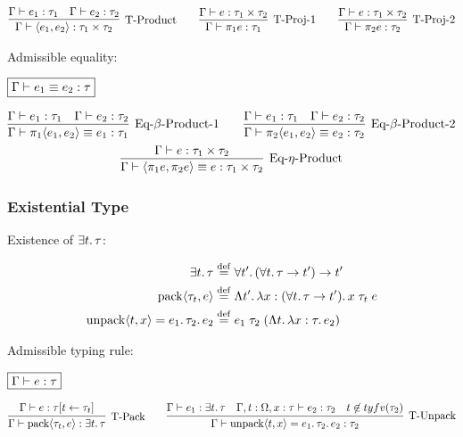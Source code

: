 \begin{gather*}
  \infer[\text{T-Product}]{\Gamma \vdash \langle e_1, e_2\rangle: \tau_1 \times \tau_2}{
    \Gamma \vdash e_1: \tau_1
    &
    \Gamma \vdash e_2: \tau_2
  }
  \hspace{2em}
  \infer[\text{T-Proj-1}]{\Gamma \vdash \pi_1 e: \tau_1}{
    \Gamma \vdash e: \tau_1 \times \tau_2
  }
  \hspace{2em}
  \infer[\text{T-Proj-2}]{\Gamma \vdash \pi_2 e: \tau_2}{
    \Gamma \vdash e: \tau_1 \times \tau_2
  }
\end{gather*}

Admissible equality:

$\fbox{$\Gamma \vdash e_1 \equiv e_2: \tau$}$

\begin{gather*}
  \infer[\text{Eq-$\beta$-Product-1}]{\Gamma \vdash \pi_1 \langle e_1, e_2\rangle \equiv e_1: \tau_1}{
    \Gamma \vdash e_1: \tau_1
    &
    \Gamma \vdash e_2: \tau_2
  }
  \hspace{2em}
  \infer[\text{Eq-$\beta$-Product-2}]{\Gamma \vdash \pi_2 \langle e_1, e_2\rangle \equiv e_2: \tau_2}{
    \Gamma \vdash e_1: \tau_1
    &
    \Gamma \vdash e_2: \tau_2
  }
  \\
  \infer[\text{Eq-$\eta$-Product}]{\Gamma \vdash \langle \pi_1 e, \pi_2 e\rangle \equiv e: \tau_1 \times \tau_2}{
    \Gamma \vdash e: \tau_1 \times \tau_2
  }
\end{gather*}

\subsubsection{Existential Type}

Existence of $\exists t\ldotp\tau$:

\begin{align*}
  \exists t\ldotp \tau &\mathrel{\overset{\mathrm{def}}{=}} \forall t'\ldotp (\forall t\ldotp \tau \to t') \to t' \\
  \mathop{\mathrm{pack}}\langle \tau_t, e\rangle &\mathrel{\overset{\mathrm{def}}{=}} \Lambda t'\ldotp \lambda x: (\forall t\ldotp \tau \to t')\ldotp x\; \tau_t\; e \\
  \mathop{\mathrm{unpack}}\langle t, x\rangle = e_1\ldotp \tau_2\ldotp e_2 &\mathrel{\overset{\mathrm{def}}{=}} e_1\; \tau_2\; (\Lambda t\ldotp \lambda x: \tau\ldotp e_2)
\end{align*}

Admissible typing rule:

$\fbox{$\Gamma \vdash e: \tau$}$

\begin{gather*}
  \infer[\text{T-Pack}]{\Gamma \vdash \sympack\langle \tau_t, e\rangle: \exists t\ldotp \tau}{
    \Gamma \vdash e: \tau[t \assign \tau_t]
  }
  \hspace{2em}
  \infer[\text{T-Unpack}]{\Gamma \vdash \symunpack\langle t, x\rangle = e_1\ldotp \tau_2\ldotp e_2: \tau_2}{
    \Gamma \vdash e_1: \exists t\ldotp \tau
    &
    \Gamma, t: \Omega, x: \tau \vdash e_2: \tau_2
    &
    t \not\in \typefreevar(\tau_2)
  }
\end{gather*}

